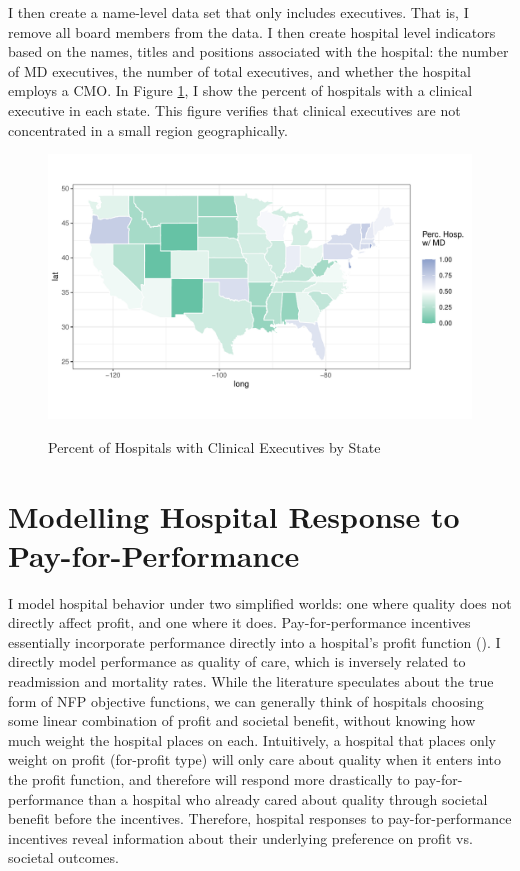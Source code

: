 \documentclass[12pt]{article}
\begin{document}
I then create a name-level data set that only includes executives. That is, I remove all board members from the data. I then create hospital level indicators based on the names, titles and positions associated with the hospital: the number of MD executives, the number of total executives, and whether the hospital employs a CMO. In Figure \ref{fig:state_doc}, I show the percent of hospitals with a clinical executive in each state. This figure verifies that clinical executives are not concentrated in a small region geographically. 

\begin{figure}[ht!]
    \centering
    \caption{Percent of Hospitals with Clinical Executives by State}
    \includegraphics[width=\textwidth]{Objects/has_doc_avg_map.pdf}
    \label{fig:state_doc}
\end{figure}

\section{Modelling Hospital Response to Pay-for-Performance}\label{sec:model}

    I model hospital behavior under two simplified worlds: one where quality does not directly affect profit, and one where it does. Pay-for-performance incentives essentially incorporate performance directly into a hospital's profit function (\cite{dranove2011health}). I directly model performance as quality of care, which is inversely related to readmission and mortality rates. While the literature speculates about the true form of NFP objective functions, we can generally think of hospitals choosing some linear combination of profit and societal benefit, without knowing how much weight the hospital places on each. Intuitively, a hospital that places only weight on profit (for-profit type) will only care about quality when it enters into the profit function, and therefore will respond more drastically to pay-for-performance than a hospital who already cared about quality through societal benefit before the incentives. Therefore, hospital responses to pay-for-performance incentives reveal information about their underlying preference on profit vs. societal outcomes. 
\end{document}
